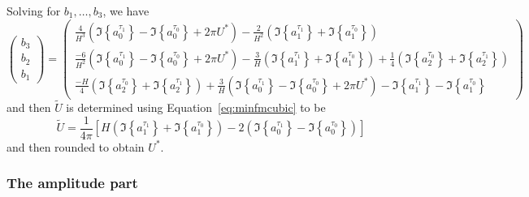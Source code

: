 Solving for $b_1, \dotsc, b_3$, we have
\[
    \begin{pmatrix}
        b_{3} \\
        b_{2} \\
        b_{1}
    \end{pmatrix}
    =
    \begin{pmatrix}
        \frac{4}{H^3} \left( \Im \left\{ a^{\tau_1}_0 \right\}
            - \Im \left\{ a^{\tau_0}_0 \right\} + 2 \pi U^{\ast} \right)
        - \frac{2}{H^{2}} \left( \Im \left\{ a^{\tau_1}_1 \right\}
            + \Im \left\{ a^{\tau_0}_1 \right\} \right) \\
        \frac{-6}{H^2} \left( \Im \left\{ a^{\tau_1}_0 \right\}
            - \Im \left\{ a^{\tau_0}_0 \right\} + 2 \pi U^{\ast} \right)
        - \frac{3}{H} \left( \Im \left\{ a^{\tau_1}_1 \right\}
            + \Im \left\{ a^{\tau_0}_1 \right\} \right)
        + \frac{1}{4}  \left( \Im \left\{ a^{\tau_0}_{2} \right\} + \Im \left\{
            a^{\tau_1}_{2} \right\} \right) \\
        \frac{-H}{4}  \left( \Im \left\{ a^{\tau_0}_{2} \right\} + \Im \left\{
            a^{\tau_1}_{2} \right\} \right) 
        + \frac{3}{H} \left( \Im \left\{ a^{\tau_1}_0 \right\}
            - \Im \left\{ a^{\tau_0}_0 \right\} + 2 \pi U^{\ast} \right)
        -  \Im \left\{ a^{\tau_1}_1 \right\}
            - \Im \left\{ a^{\tau_0}_1 \right\}
    \end{pmatrix}
\]
and then $\tilde{U}$ is determined using Equation~\ref{eq:minfmcubic} to be
\[
    \tilde{U} = \frac{1}{4 \pi} \left[ H \left( \Im \left\{ a^{\tau_1}_1
            \right\} + \Im \left\{
        a^{\tau_0}_1 \right\} \right)
        -2 \left( \Im \left\{ a^{\tau_1}_0 \right\} - \Im \left\{
        a^{\tau_0}_0 \right\} \right) \right]
\]
and then rounded to obtain $U^{\ast}$.

\subsubsection{The amplitude part}

